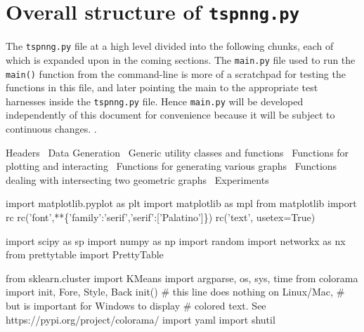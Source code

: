 \section{Overall structure of \texttt{tspnng.py}}%

The \texttt{tspnng.py} file at a high level divided into the following chunks, 
each of which is expanded upon in the coming sections. The \texttt{main.py} file used to run the \texttt{main()} function
from the command-line is more of a  scratchpad for testing the functions in this file, and later pointing the 
main to the appropriate test harnesses inside the \texttt{tspnng.py} file. Hence \texttt{main.py} will be developed 
independently of this document for convenience because it will be subject to continuous changes. .  

\nwenddocs{}\endmoddef\nwstartdeflinemarkup\nwenddeflinemarkup

\LA{}Headers~{\nwtagstyle{}}\RA{}
\LA{}Data Generation~{\nwtagstyle{}}\RA{}
\LA{}Generic utility classes and functions~{\nwtagstyle{}}\RA{}
\LA{}Functions for plotting and interacting~{\nwtagstyle{}}\RA{}
\LA{}Functions for generating various graphs~{\nwtagstyle{}}\RA{}
\LA{}Functions dealing with intersecting two geometric graphs~{\nwtagstyle{}}\RA{}
\LA{}Experiments~{\nwtagstyle{}}\RA{}
\nwendcode{}\nwdocspar


\nwenddocs{}\endmoddef\nwstartdeflinemarkup{}\nwenddeflinemarkup
import matplotlib.pyplot as plt
import matplotlib as mpl
from matplotlib import rc
rc('font',**\{'family':'serif','serif':['Palatino']\})
rc('text', usetex=True)

import scipy as sp
import numpy as np
import random
import networkx as nx
from prettytable import PrettyTable

from sklearn.cluster import KMeans
import argparse, os, sys, time
from colorama import init, Fore, Style, Back
init() # this line does nothing on Linux/Mac,
       # but is important for Windows to display
       # colored text. See https://pypi.org/project/colorama/
import yaml
import shutil
\nwendcode{}\nwdocspar


